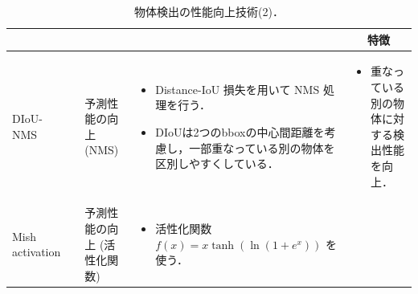 \documentclass[twocolumn]{jsarticle} %
\begin{document}
\begin{table}
    \caption{物体検出の性能向上技術(2)．}
    \label{tbl-option2}
    \begin{center}
        \setlength{\tabcolsep}{3pt}
        \footnotesize
        \begin{tabularx}{\linewidth}{XcXp{7cm}X} \toprule
            \centering{技術名称} & \centering{文献} & \centering{用途} & \centering{概要} & \multicolumn{1}{c}{特徴} \\ \midrule

            DIoU-NMS
            & \cite{ZWLLYR20} & 予測性能の向上 (NMS) & 
            \begin{itemize}
                \vspace{-0.7\baselineskip}
                \setlength{\leftskip}{-3mm}
                \item Distance-IoU 損失を用いて NMS 処理を行う．
                \item DIoUは2つのbboxの中心間距離を考慮し，一部重なっている別の物体を区別しやすくしている．
            \end{itemize}
            &
            \begin{itemize}
                \vspace{-0.7\baselineskip}
                \setlength{\leftskip}{-3mm}
                \item 重なっている別の物体に対する検出性能を向上．
            \end{itemize}
            \\

            Mish activation
            & \cite{Misra20} & 予測性能の向上 (活性化関数) 
            \vspace{0.7\baselineskip}
            & 
            \begin{itemize}
                \vspace{-0.7\baselineskip}
                \setlength{\leftskip}{-3mm}
                \item 活性化関数 $f(x) = x \tanh(\ln(1 + e^x))$ を使う．
            \end{itemize}
            &
            \\


\end{tabularx}
\end{center}
\end{table}
\end{document}

